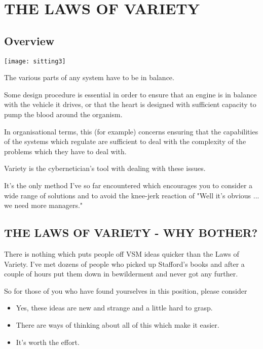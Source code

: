\chapter{THE LAWS OF VARIETY}\label{THE LAWS OF VARIETY}
\section*{Overview}
\begin{center}
\texttt{[image: sitting3]}
\end{center}

The various parts of any system have to be in balance.

Some design procedure is essential in order to ensure that an engine is in balance with the vehicle it drives, or that the heart is designed with sufficient capacity to pump the blood around the organism.

In organisational terms, this (for example) concerns ensuring that the capabilities of the systems which regulate are sufficient to deal with the complexity of the problems which they have to deal with.

Variety is the cybernetician's tool with dealing with these issues.

It's the only method I've so far encountered which encourages you to consider a wide range of solutions and to avoid the knee-jerk reaction of "Well it's obvious ... we need more managers."

\section*{THE LAWS OF VARIETY - WHY BOTHER?}
There is nothing which puts people off VSM ideas quicker than the Laws of Variety. I've met dozens of people who picked up Stafford's books and after a couple of hours put them down in bewilderment and never got any further.

So for those of you who have found yourselves in this position, please consider

\begin{itemize}
  \item Yes, these ideas are new and strange and a little hard to grasp.

  \item There are ways of thinking about all of this which make it easier.

  \item It's worth the effort.

\end{itemize}

